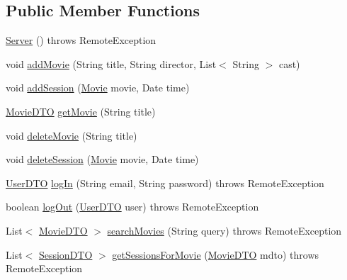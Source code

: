 \subsection*{Public Member Functions}
\begin{DoxyCompactItemize}
\item 
\mbox{\hyperlink{classes_1_1deusto_1_1server_1_1_server_a84f78162a65dd737f224eb2f94c43023}{Server}} ()  throws Remote\+Exception 
\item 
void \mbox{\hyperlink{classes_1_1deusto_1_1server_1_1_server_a150317903dc393d29f39db81e79131e0}{add\+Movie}} (String title, String director, List$<$ String $>$ cast)
\item 
void \mbox{\hyperlink{classes_1_1deusto_1_1server_1_1_server_abca83b4649011a8a68af754bbd25e22d}{add\+Session}} (\mbox{\hyperlink{classes_1_1deusto_1_1server_1_1jdo_1_1_movie}{Movie}} movie, Date time)
\item 
\mbox{\hyperlink{classes_1_1deusto_1_1server_1_1data_1_1_movie_d_t_o}{Movie\+D\+TO}} \mbox{\hyperlink{classes_1_1deusto_1_1server_1_1_server_a7e4544c63bcf2b2d3abce0d2ff1567ac}{get\+Movie}} (String title)
\item 
void \mbox{\hyperlink{classes_1_1deusto_1_1server_1_1_server_a6501e4103fcc2ef691c15e4e02f7136c}{delete\+Movie}} (String title)
\item 
void \mbox{\hyperlink{classes_1_1deusto_1_1server_1_1_server_aa5f1973de47331683592355aaa036bfb}{delete\+Session}} (\mbox{\hyperlink{classes_1_1deusto_1_1server_1_1jdo_1_1_movie}{Movie}} movie, Date time)
\item 
\mbox{\hyperlink{classes_1_1deusto_1_1server_1_1data_1_1_user_d_t_o}{User\+D\+TO}} \mbox{\hyperlink{classes_1_1deusto_1_1server_1_1_server_ab93f5cc9b5825192c31cd2088014378d}{log\+In}} (String email, String password)  throws Remote\+Exception 
\item 
boolean \mbox{\hyperlink{classes_1_1deusto_1_1server_1_1_server_a92cf8a599adfa6a34f7cfe788119cf0a}{log\+Out}} (\mbox{\hyperlink{classes_1_1deusto_1_1server_1_1data_1_1_user_d_t_o}{User\+D\+TO}} user)  throws Remote\+Exception 
\item 
List$<$ \mbox{\hyperlink{classes_1_1deusto_1_1server_1_1data_1_1_movie_d_t_o}{Movie\+D\+TO}} $>$ \mbox{\hyperlink{classes_1_1deusto_1_1server_1_1_server_a16789cc76edd46978ffbb58581caf5db}{search\+Movies}} (String query)  throws Remote\+Exception 
\item 
List$<$ \mbox{\hyperlink{classes_1_1deusto_1_1server_1_1data_1_1_session_d_t_o}{Session\+D\+TO}} $>$ \mbox{\hyperlink{classes_1_1deusto_1_1server_1_1_server_a33a6671bb4dc4bd9e23df10e53e5632d}{get\+Sessions\+For\+Movie}} (\mbox{\hyperlink{classes_1_1deusto_1_1server_1_1data_1_1_movie_d_t_o}{Movie\+D\+TO}} mdto)  throws Remote\+Exception 

\end{DoxyCompactItemize}
